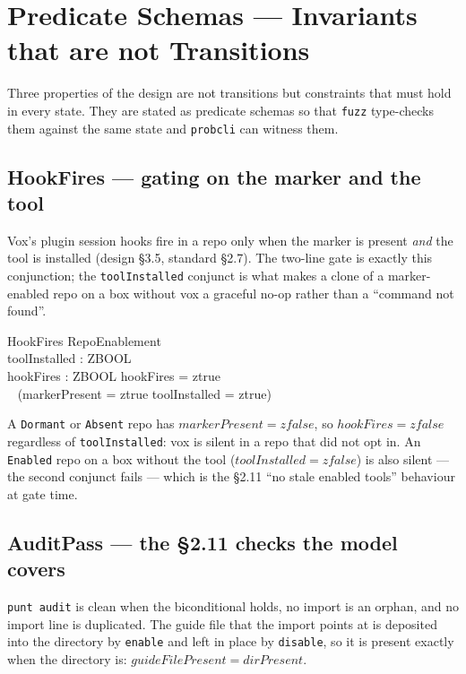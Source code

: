 \documentclass[a4paper,10pt,fleqn]{article}
\begin{document}
\section{Predicate Schemas --- Invariants that are not Transitions}
\label{sec:predicates}

Three properties of the design are not transitions but constraints that must
hold in every state. They are stated as predicate schemas so that
\texttt{fuzz} type-checks them against the same state and \texttt{probcli} can
witness them.

\subsection{HookFires --- gating on the marker and the tool}

Vox's plugin session hooks fire in a repo only when the marker is present
\emph{and} the tool is installed (design \S3.5, standard \S2.7). The two-line
gate is exactly this conjunction; the \texttt{toolInstalled} conjunct is what
makes a clone of a marker-enabled repo on a box without vox a graceful no-op
rather than a ``command not found''.

\begin{schema}{HookFires}
  RepoEnablement \\
  toolInstalled : ZBOOL \\
  hookFires : ZBOOL
  \where
  hookFires = ztrue \iff \\
  \quad~ (markerPresent = ztrue \land toolInstalled = ztrue)
\end{schema}

A \texttt{Dormant} or \texttt{Absent} repo has $markerPresent = zfalse$, so
$hookFires = zfalse$ regardless of \texttt{toolInstalled}: vox is silent in a
repo that did not opt in. An \texttt{Enabled} repo on a box without the tool
($toolInstalled = zfalse$) is also silent --- the second conjunct fails --- which
is the \S2.11 ``no stale enabled tools'' behaviour at gate time.

\subsection{AuditPass --- the \S2.11 checks the model covers}

\texttt{punt audit} is clean when the biconditional holds, no import is an
orphan, and no import line is duplicated. The guide file that the import points
at is deposited into the directory by \texttt{enable} and left in place by
\texttt{disable}, so it is present exactly when the directory is:
$guideFilePresent = dirPresent$.
\end{document}

